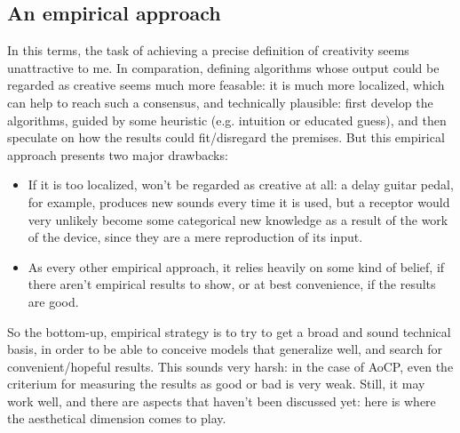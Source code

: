 \documentclass[11pt]{scrartcl} %
\begin{document}
\subsection*{An empirical approach}
In this terms, the task of achieving a precise definition of creativity seems unattractive to me. In comparation, defining algorithms whose output could be regarded as creative seems much more feasable: it is much more localized, which can help to reach such a consensus, and technically plausible: first develop the algorithms, guided by some heuristic (e.g. intuition or educated guess), and then speculate on how the results could fit/disregard the premises. But this empirical approach presents two major drawbacks:
\begin{itemize}
\item If it is too localized, won't be regarded as creative at all: a delay guitar pedal, for example, produces new sounds every time it is used, but a receptor would very unlikely become some categorical new knowledge as a result of the work of the device, since they are a mere reproduction of its input.
\item As every other empirical approach, it relies heavily on some kind of belief, if there aren't empirical results to show, or at best convenience, if the results are good.
\end{itemize}
So the bottom-up, empirical strategy is to try to get a broad and sound technical basis, in order to be able to conceive models that generalize well, and search for convenient/hopeful results. This sounds very harsh: in the case of AoCP, even the criterium for measuring the results as good or bad is very weak. Still, it may work well, and there are aspects that haven't been discussed yet: here is where the aesthetical dimension comes to play.
\end{document}
